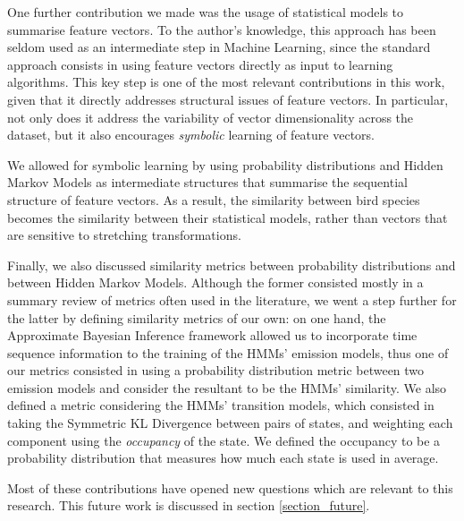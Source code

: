 \documentclass[../main.tex]{subfiles}
\begin{document}
\par One further contribution we made was the usage of statistical models to summarise feature vectors. To the author's knowledge, this approach has been seldom used as an intermediate step in Machine Learning, since the standard approach consists in using feature vectors directly as input to learning algorithms. This key step is one of the most relevant contributions in this work, given that it directly addresses structural issues of feature vectors. In particular, not only does it address the variability of vector dimensionality across the dataset, but it also encourages \emph{symbolic} learning of feature vectors. 
\par We allowed for symbolic learning by using probability distributions and Hidden Markov Models as intermediate structures that summarise the sequential structure of feature vectors. As a result, the similarity between bird species becomes the similarity between their statistical models, rather than vectors that are sensitive to stretching transformations.
\par Finally, we also discussed similarity metrics between probability distributions and between Hidden Markov Models. Although the former consisted mostly in a summary review of metrics often used in the literature, we went a step further for the latter by defining similarity metrics of our own: on one hand, the Approximate Bayesian Inference framework allowed us to incorporate time sequence information to the training of the HMMs' emission models, thus one of our metrics consisted in using a probability distribution metric between two emission models and consider the resultant to be the HMMs' similarity. We also defined a metric considering the HMMs' transition models, which consisted in taking the Symmetric KL Divergence between pairs of states, and weighting each component using the \emph{occupancy} of the state. We defined the occupancy to be a probability distribution that measures how much each state is used in average.
\par Most of these contributions have opened new questions which are relevant to this research. This future work is discussed in section \ref{section_future}.
\end{document}
